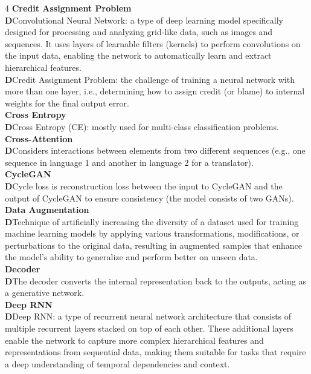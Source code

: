 \documentclass[8pt]{extarticle}
\newcommand{\dtag}{\textcolor{definitioncolor}{\tiny\textbf{D}}\;}
\begin{document}
\begin{multicols}{4}
\vspace{2pt}\textbf{Credit Assignment Problem}\\
\dtag Convolutional Neural Network: a type of deep learning model specifically designed for processing and analyzing grid-like data, such as images and sequences. It uses layers of learnable filters (kernels) to perform convolutions on the input data, enabling the network to automatically learn and extract hierarchical features.\\
\dtag Credit Assignment Problem: the challenge of training a neural network with more than one layer, i.e., determining how to assign credit (or blame) to internal weights for the final output error.\\
\vspace{2pt}\textbf{Cross Entropy}\\
\dtag Cross Entropy (CE): mostly used for multi-class classification problems.\\
\vspace{2pt}\textbf{Cross-Attention}\\
\dtag Considers interactions between elements from two different sequences (e.g., one sequence in language 1 and another in language 2 for a translator).\\
\vspace{2pt}\textbf{CycleGAN}\\
\dtag Cycle loss is reconstruction loss between the input to CycleGAN and the output of CycleGAN to ensure consistency (the model consists of two GANs).\\
\vspace{2pt}\textbf{Data Augmentation}\\
\dtag Technique of artificially increasing the diversity of a dataset used for training machine learning models by applying various transformations, modifications, or perturbations to the original data, resulting in augmented samples that enhance the model's ability to generalize and perform better on unseen data.\\
\vspace{2pt}\textbf{Decoder}\\
\dtag The decoder converts the internal representation back to the outputs, acting as a generative network.\\
\vspace{2pt}\textbf{Deep RNN}\\
\dtag Deep RNN: a type of recurrent neural network architecture that consists of multiple recurrent layers stacked on top of each other. These additional layers enable the network to capture more complex hierarchical features and representations from sequential data, making them suitable for tasks that require a deep understanding of temporal dependencies and context.\\

\end{multicols}
\end{document}
